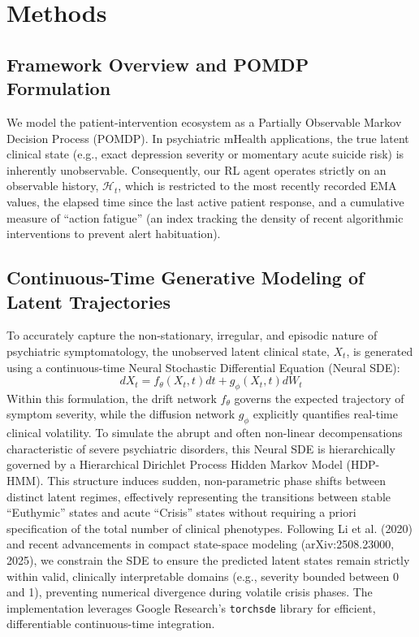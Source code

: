 \section{Methods}

\subsection{Framework Overview and POMDP Formulation}
We model the patient-intervention ecosystem as a Partially Observable Markov Decision Process (POMDP). In psychiatric mHealth applications, the true latent clinical state (e.g., exact depression severity or momentary acute suicide risk) is inherently unobservable. Consequently, our RL agent operates strictly on an observable history, $\mathcal{H}_t$, which is restricted to the most recently recorded EMA values, the elapsed time since the last active patient response, and a cumulative measure of ``action fatigue'' (an index tracking the density of recent algorithmic interventions to prevent alert habituation).

\subsection{Continuous-Time Generative Modeling of Latent Trajectories}
To accurately capture the non-stationary, irregular, and episodic nature of psychiatric symptomatology, the unobserved latent clinical state, $X_t$, is generated using a continuous-time Neural Stochastic Differential Equation (Neural SDE):
$$dX_t = f_\theta(X_t, t)dt + g_\phi(X_t, t)dW_t$$
Within this formulation, the drift network $f_\theta$ governs the expected trajectory of symptom severity, while the diffusion network $g_\phi$ explicitly quantifies real-time clinical volatility. To simulate the abrupt and often non-linear decompensations characteristic of severe psychiatric disorders, this Neural SDE is hierarchically governed by a Hierarchical Dirichlet Process Hidden Markov Model (HDP-HMM). This structure induces sudden, non-parametric phase shifts between distinct latent regimes, effectively representing the transitions between stable ``Euthymic'' states and acute ``Crisis'' states without requiring a priori specification of the total number of clinical phenotypes. Following Li et al. (2020) and recent advancements in compact state-space modeling (arXiv:2508.23000, 2025), we constrain the SDE to ensure the predicted latent states remain strictly within valid, clinically interpretable domains (e.g., severity bounded between 0 and 1), preventing numerical divergence during volatile crisis phases. The implementation leverages Google Research's \texttt{torchsde} library for efficient, differentiable continuous-time integration.

